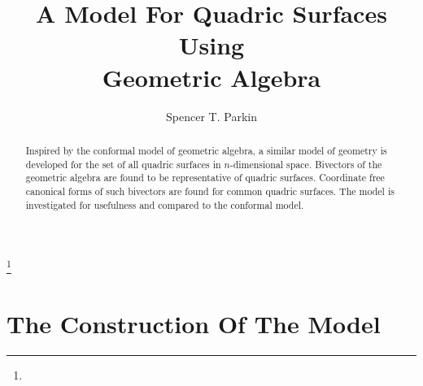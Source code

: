 \documentclass{ecgd-l}
\theoremstyle{definition}
\theoremstyle{remark}
\numberwithin{equation}{section}
\begin{document}
\title{A Model For Quadric Surfaces\\Using\\Geometric Algebra}


\author{Spencer T. Parkin}
\address{2113 S. Claremont Dr., Bountiful, Utah  84010}
\curraddr{}
\thanks{}



\date{}

\dedicatory{}

\begin{abstract}
Inspired by the conformal model of geometric algebra,
a similar model of geometry is developed for the set
of all quadric surfaces in $n$-dimensional space.  Bivectors of the geometric algebra
are found to be representative of quadric surfaces.  Coordinate free canonical forms
of such bivectors are found for common quadric surfaces.  The model is investigated
for usefulness and compared to the conformal model.
\end{abstract}

\maketitle


\section{The Construction Of The Model}
\end{document}

